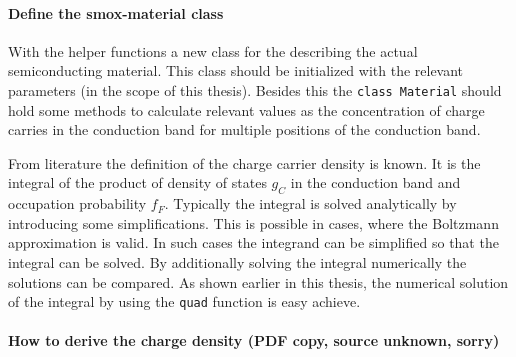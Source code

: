 \documentclass[11pt]{article}
\begin{document}
    \hypertarget{define-the-smox-material-class}{%
\paragraph{Define the smox-material
class}\label{define-the-smox-material-class}}

With the helper functions a new class for the describing the actual
semiconducting material. This class should be initialized with the
relevant parameters (in the scope of this thesis). Besides this the
\texttt{class\ Material} should hold some methods to calculate relevant
values as the concentration of charge carries in the conduction band for
multiple positions of the conduction band.

From literature the definition of the charge carrier density is known.
It is the integral of the product of density of states \(g_C\) in the
conduction band and occupation probability \(f_F\). Typically the
integral is solved analytically by introducing some simplifications.
This is possible in cases, where the Boltzmann approximation is valid.
In such cases the integrand can be simplified so that the integral can
be solved. By additionally solving the integral numerically the
solutions can be compared. As shown earlier in this thesis, the
numerical solution of the integral by using the \texttt{quad} function
is easy achieve.

    \hypertarget{how-to-derive-the-charge-density-pdf-copy-source-unknown-sorry}{%
\paragraph{How to derive the charge density (PDF copy, source unknown,
sorry)}\label{how-to-derive-the-charge-density-pdf-copy-source-unknown-sorry}}
\end{document}
